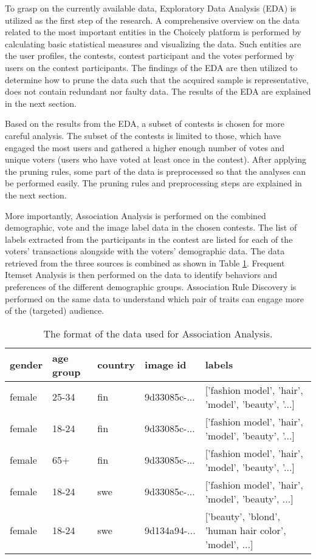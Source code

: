 To grasp on the currently available data, Exploratory Data Analysis (EDA) is utilized as the first step of the research. A comprehensive overview on the data related to the most important entities in the Choicely platform is performed by calculating basic statistical measures and visualizing the data. Such entities are the user profiles, the contests, contest participant and the votes performed by users on the contest participants. The findings of the EDA are then utilized to determine how to prune the data such that the acquired sample is representative, does not contain redundant nor faulty data. The results of the EDA are explained in the next section. 

Based on the results from the EDA, a subset of contests is chosen for more careful analysis. The subset of the contests is limited to those, which have engaged the most users and gathered a higher enough number of votes and unique voters (users who have voted at least once in the contest). After applying the pruning rules, some part of the data is preprocessed so that the analyses can be performed easily. The pruning rules and preprocessing steps are explained in the next section. 

More importantly, Association Analysis is performed on the combined demographic, vote and the image label data in the chosen contests. The list of labels extracted from the participants in the contest are listed for each of the voters' transactions alongside with the voters' demographic data. The data retrieved from the three sources is combined as shown in Table \ref{association_analyisis_data}. Frequent Itemset Analysis is then performed on the data to identify behaviors and preferences of the different demographic groups. Association Rule Discovery is performed on the same data to understand which pair of traits can engage more of the (targeted) audience.  

\begin{table}[]
    \centering
    \begin{tabular}{l|l|l|l|l}
        gender & age group & country & image id & labels \\
        \hline
        female & 25-34 & fin & 9d33085c-... & ['fashion model', 'hair', 'model', 'beauty', '...] \\
        female & 18-24 & fin & 9d33085c-... & ['fashion model', 'hair', 'model', 'beauty', '...] \\
        female & 65+ & fin & 9d33085c-... & ['fashion model', 'hair', 'model', 'beauty', '...] \\
        female & 18-24 & swe & 9d33085c-... & ['fashion model', 'hair', 'model', 'beauty', ...] \\
        female & 18-24 & swe & 9d134a94-... & ['beauty', 'blond', 'human hair color', 'model', ...]
    \end{tabular}
    \caption{The format of the data used for Association Analysis.}
    \label{association_analyisis_data}
\end{table}

